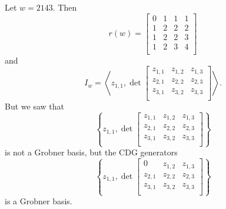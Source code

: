 \documentclass[co439]{subfiles}
\begin{document}
    \begin{example}{}
        Let $w=2143$. Then
        \begin{equation*}
            r\left( w \right) =
            \begin{bmatrix}
            	0 & 1 & 1 & 1 \\
            	1 & 2 & 2 & 2 \\
            	1 & 2 & 2 & 3 \\
            	1 & 2 & 3 & 4 \\
            \end{bmatrix}
        \end{equation*}
        and
        \begin{equation*}
            I_w = \left< z_{1,1}, \det
            \begin{bmatrix}
                z_{1,1} & z_{1,2} & z_{1,3} \\
                z_{2,1} & z_{2,2} & z_{2,3} \\
                z_{3,1} & z_{3,2} & z_{3,3} \\
            \end{bmatrix} \right>.
        \end{equation*}
        But we saw that
        \begin{equation*}
            \left\lbrace z_{1,1}, \det
            \begin{bmatrix}
                z_{1,1} & z_{1,2} & z_{1,3} \\
                z_{2,1} & z_{2,2} & z_{2,3} \\
                z_{3,1} & z_{3,2} & z_{3,3} \\
            \end{bmatrix} \right\rbrace
        \end{equation*}
        is not a Grobner basis, but the CDG generators
        \begin{equation*}
            \left\lbrace z_{1,1}, \det
            \begin{bmatrix}
                0 & z_{1,2} & z_{1,3} \\
                z_{2,1} & z_{2,2} & z_{2,3} \\
                z_{3,1} & z_{3,2} & z_{3,3} \\
            \end{bmatrix} \right\rbrace
        \end{equation*}
        is a Grobner basis.
    \end{example}
\end{document}

